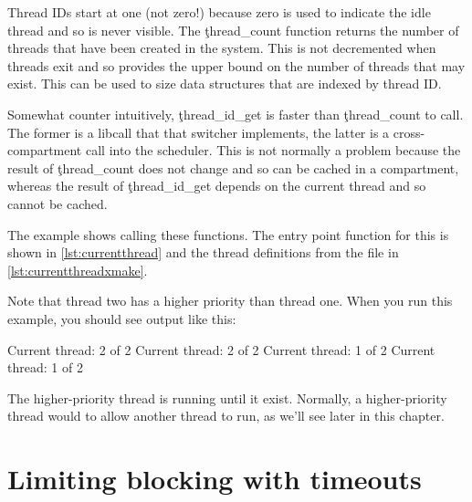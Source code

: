 
Thread IDs start at one (not zero!) because zero is used to indicate the idle thread and so is never visible.
The \c{thread_count} function returns the number of threads that have been created in the system.
This is not decremented when threads exit and so provides the upper bound on the number of threads that may exist.
This can be used to size data structures that are indexed by thread ID.


\begin{caution}
	Somewhat counter intuitively, \c{thread_id_get} is faster than \c{thread_count} to call.
	The former is a libcall that that switcher implements, the latter is a cross-compartment call into the scheduler.
	This is not normally a problem because the result of \c{thread_count} does not change and so can be cached in a compartment, whereas the result of \c{thread_id_get} depends on the current thread and so cannot be cached.
\end{caution}

The  example shows calling these functions.
The entry point function for this is shown in \ref{lst:currentthread} and the thread definitions from the  file in \ref{lst:currentthreadxmake}.

\codelisting[filename=examples/current_thread/current.cc,marker=entry,label=lst:currentthread,caption="A simple example that prints the current thread"]{}

\lualisting[filename=examples/current_thread/xmake.lua,marker=threads,label=lst:currentthreadxmake,caption="The thread definitions for the current-thread example"]{}

Note that thread two has a higher priority than thread one.
When you run this example, you should see output like this:

\begin{console}
Current thread: 2 of 2
Current thread: 2 of 2
Current thread: 1 of 2
Current thread: 1 of 2
\end{console}


The higher-priority thread is running until it exist.
Normally, a higher-priority thread would  to allow another thread to run, as we'll see later in this chapter.

\section[label=timeouts]{Limiting blocking with timeouts}

